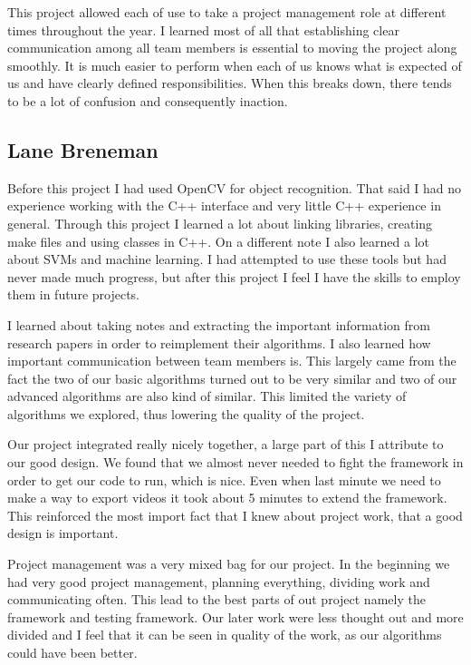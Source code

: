 \documentclass[letterpaper,10pt,titlepage]{article}
\begin{document}
This project allowed each of use to take a project management role at different
times throughout the year. I learned most of all that establishing clear 
communication among all team members is essential to moving the project along 
smoothly. It is much easier to perform when each of us knows what is expected
of us and have clearly defined responsibilities. When this breaks down, there 
tends to be a lot of confusion and consequently inaction. 

\subsection*{Lane Breneman}

Before this project I had used OpenCV for object recognition. That said I had
no experience working with the C++ interface and very little C++ experience in
general. Through this project I learned a lot about linking libraries, creating
make files and using classes in C++. On a different note I also learned a lot
about SVMs and machine learning. I had attempted to use these tools but had
never made much progress, but after this project I feel I have the skills to
employ them in future projects.

I learned about taking notes and extracting the important information from 
research papers in order to reimplement their algorithms. I also learned 
how important communication between team members is. This largely came from
the fact the two of our basic algorithms turned out to be very similar and 
two of our advanced algorithms are also kind of similar. This limited the
variety of algorithms we explored, thus lowering the quality of the project.

Our project integrated really nicely together, a large part of this I 
attribute to our good design. We found that we almost never needed to
fight the framework in order to get our code to run, which is nice. 
Even when last minute we need to make a way to export videos it took 
about 5 minutes to extend the framework. This reinforced the most 
import fact that I knew about project work, that a good design is 
important.

Project management was a very mixed bag for our project. In the 
beginning we had very good project management, planning everything,
dividing work and communicating often. This lead to the best parts
of out project namely the framework and testing framework. Our later work
were less thought out and more divided and I feel that it can be seen in
quality of the work, as our algorithms could have been better.
\end{document}
